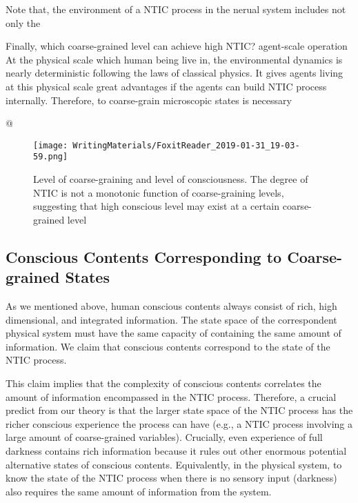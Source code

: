 	    Note that, the environment of a NTIC process in the nerual system includes not only the
        
        Finally, which coarse-grained level can achieve high NTIC? 
        agent-scale operation
        At the physical scale which human being live in, the environmental dynamics is nearly deterministic following the laws of classical physics. It gives agents living at this physical scale great advantages if the agents can build NTIC process internally. Therefore, to coarse-grain microscopic states is necessary
	    
	    
		\begin{ants}
			
			@ 
			
				\begin{figure}[H]				
				\texttt{[image: WritingMaterials/FoxitReader\_2019-01-31\_19-03-59.png]}
				\label{fig:LevelOfConsciousness}
				\caption{Level of coarse-graining and level of consciousness. The degree of NTIC is not a monotonic function of coarse-graining levels, suggesting that high conscious level may exist at a certain coarse-grained level }
				\end{figure}
		\end{ants}

\rlend
{}
		\subsection{Conscious Contents Corresponding to Coarse-grained States}
        As we mentioned above, human conscious contents always consist of rich,  high dimensional, and integrated information. The state space of the correspondent physical system must have the same capacity of containing the same amount of information. We claim that conscious contents correspond to the state of the NTIC process. 
        
        This claim implies that the complexity of conscious contents correlates the amount of information encompassed in the NTIC process. Therefore, a crucial predict from our theory is that the larger state space of the NTIC process has the richer  conscious experience the process can have (e.g., a NTIC process involving a large amount of coarse-grained variables). Crucially, even experience of full darkness contains rich information because it rules out other enormous potential alternative states of conscious contents. Equivalently, in the physical system, to know the state of the NTIC process when there is no sensory input (darkness) also requires the same amount of information from the system. 
        
